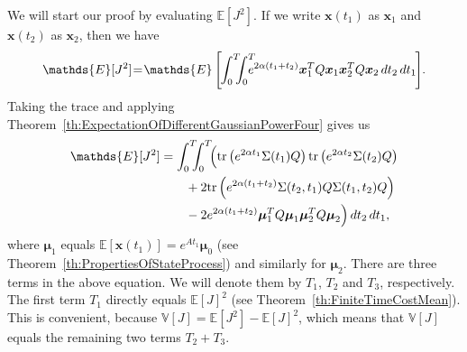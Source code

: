 \documentclass[twocolumn]{autart}
\newcommand{\ve}[1]{{\boldsymbol{#1}}} \newcommand{\tr}{\mbox{tr}} \newcommand{\ex}{\mathds{E}} \newcommand{\va}{\mathds{V}}
\begin{document}
\begin{pf}
We will start our proof by evaluating $\ex[J^2]$. If we write $\ve{x}(t_1)$ as $\ve{x}_1$ and $\ve{x}(t_2)$ as $\ve{x}_2$, then we have
\begin{equation}
\ex[J^2] \hspace{-2pt}=\hspace{-2pt} \ex\left[\hspace{-1pt}\int_0^T \hspace{-6pt} \int_0^T \hspace{-8pt} e^{2\alpha (t_1 + t_2)} \ve{x}_1^T Q \ve{x}_1 \ve{x}_2^T Q \ve{x}_2 \, dt_2 \, dt_1\hspace{-1pt}\right]\hspace{-2pt}.
\end{equation}
Taking the trace and applying Theorem~\ref{th:ExpectationOfDifferentGaussianPowerFour} gives us
\begin{align}
\ex[J^2] & = \int_0^T \hspace{-6pt} \int_0^T \hspace{-4pt} \Big( \tr\left(e^{2\alpha t_1}\Sigma(t_1) Q\right) \tr\left(e^{2\alpha t_2}\Sigma(t_2) Q\right) \nonumber \\
& \hspace{20pt} + 2\tr\left(e^{2\alpha(t_1+t_2)}\Sigma(t_2,t_1) Q \Sigma(t_1,t_2) Q\right) \nonumber \\
& \hspace{20pt} - 2e^{2\alpha(t_1+t_2)}\ve{\mu}_1^T Q \ve{\mu}_1 \ve{\mu}_2^T Q \ve{\mu}_2 \Big) \, dt_2 \, dt_1, \label{eq:WorkedOutExpressionEJ2}
\end{align}
where $\ve{\mu}_1$ equals $\ex[\ve{x}(t_1)] = e^{At_1} \ve{\mu}_0$ (see Theorem~\ref{th:PropertiesOfStateProcess}) and similarly for $\ve{\mu}_2$. There are three terms in the above equation. We will denote them by $T_1$, $T_2$ and $T_3$, respectively. The first term $T_1$ directly equals $\ex[J]^2$ (see Theorem~\ref{th:FiniteTimeCostMean}). This is convenient, because $\va[J] = \ex[J^2] - \ex[J]^2$, which means that $\va[J]$ equals the remaining two terms $T_2 + T_3$.


\end{pf}
\end{document}
